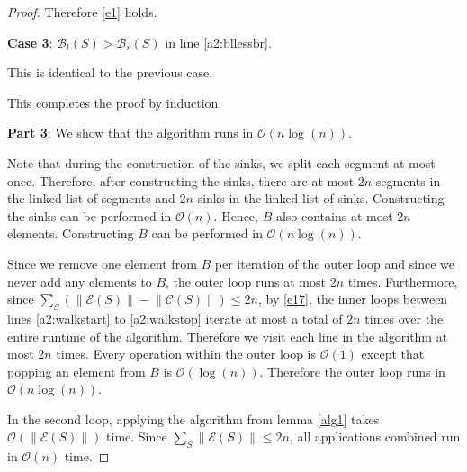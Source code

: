 \documentclass[11pt,a4paper]{article}
\newcommand{\norm}[1]{\left\lVert #1 \right\rVert}
\newcommand{\bO}{\mathcal{O}}
\begin{document}
\begin{proof}
Therefore \ref{e1} holds.

\textbf{Case 3}: $\mathcal{B}_l(S) > \mathcal{B}_r(S)$ in line \ref{a2:bllessbr}.

This is identical to the previous case.

This completes the proof by induction.

\textbf{Part 3}: We show that the algorithm runs in $\bO(n\log(n))$.

Note that during the construction of the sinks, we split each segment at most once.
Therefore, after constructing the sinks, there are at most $2n$ segments in the linked list of segments and $2n$ sinks in the linked list of sinks.
Constructing the sinks can be performed in $\bO(n)$.
Hence, $B$ also contains at most $2n$ elements.
Constructing $B$ can be performed in $\bO(n\log(n))$.

Since we remove one element from $B$ per iteration of the outer loop and since we never add any elements to $B$, the outer loop runs at most $2n$ times.
Furthermore, since $\sum_S\left(\norm{\mathcal{E}(S)} - \norm{\mathcal{C}(S)}\right) \le 2n$, by \ref{e17}, the inner loops between lines \ref{a2:walkstart} to \ref{a2:walkstop} iterate at most a total of $2n$ times over the entire runtime of the algorithm.
Therefore we visit each line in the algorithm at most $2n$ times.
Every operation within the outer loop is $\bO(1)$ except that popping an element from $B$ is $\bO(\log(n))$.
Therefore the outer loop runs in $\bO(n\log(n))$.

In the second loop, applying the algorithm from lemma \ref{alg1} takes $\bO(\norm{\mathcal{E}(S)})$ time.
Since $\sum_S\norm{\mathcal{E}(S)}\le 2n$, all applications combined run in $\bO(n)$ time.


\end{proof}
\end{document}
